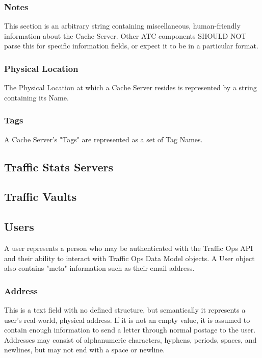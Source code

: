 \subsubsection{Notes}
This section is an arbitrary string containing miscellaneous, human-friendly
information about the Cache Server. Other ATC components SHOULD NOT parse this
for specific information fields, or expect it to be in a particular format.

\subsubsection{Physical Location}
The Physical Location at which a Cache Server resides is represented by a string
containing its Name.

\subsubsection{Tags}
A Cache Server's "Tags" are represented as a set of Tag Names.


\subsection{Traffic Stats Servers}



\subsection{Traffic Vaults}



\subsection{Users\label{sec:users}}
A user represents a person who may be authenticated with the Traffic Ops API and
their ability to interact with Traffic Ops Data Model objects. A User object
also contains "meta" information such as their email address.

\subsubsection{Address}
This is a text field with no defined structure, but semantically it represents a
user's real-world, physical address. If it is not an empty value, it is assumed
to contain enough information to send a letter through normal postage to the
user.\\
Addresses may consist of alphanumeric characters, hyphens, periods, spaces, and
newlines, but may not end with a space or newline.

